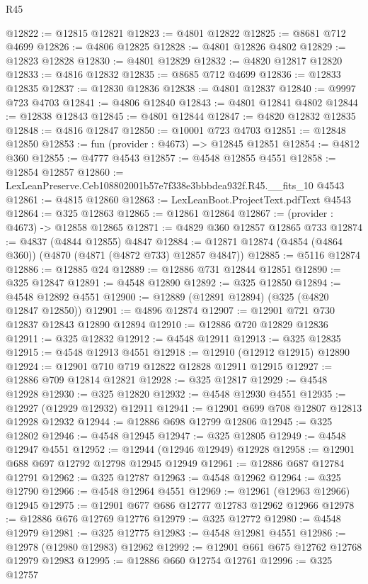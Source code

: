 \begin{lexlean}{R45}
\begin{coremodule}
@12822 := @12815 @12821
@12823 := @4801 @12822
@12825 := @8681 @712 @4699
@12826 := @4806 @12825
@12828 := @4801 @12826 @4802
@12829 := @12823 @12828
@12830 := @4801 @12829
@12832 := @4820 @12817 @12820
@12833 := @4816 @12832
@12835 := @8685 @712 @4699
@12836 := @12833 @12835
@12837 := @12830 @12836
@12838 := @4801 @12837
@12840 := @9997 @723 @4703
@12841 := @4806 @12840
@12843 := @4801 @12841 @4802
@12844 := @12838 @12843
@12845 := @4801 @12844
@12847 := @4820 @12832 @12835
@12848 := @4816 @12847
@12850 := @10001 @723 @4703
@12851 := @12848 @12850
@12853 := fun (provider : @4673) => @12845 @12851
@12854 := @4812 @360
@12855 := @4777 @4543
@12857 := @4548 @12855 @4551
@12858 := @12854 @12857
@12860 := LexLeanPreserve.Ceb108802001b57e7f338e3bbbdea932f.R45.__fits_10 @4543
@12861 := @4815 @12860
@12863 := LexLeanBoot.ProjectText.pdfText @4543
@12864 := @325 @12863
@12865 := @12861 @12864
@12867 := (provider : @4673) -> @12858 @12865
@12871 := @4829 @360 @12857 @12865 @733
@12874 := @4837 (@4844 @12855) @4847
@12884 := @12871 @12874 (@4854 (@4864 @360)) (@4870 (@4871 (@4872 @733) @12857 @4847))
@12885 := @5116 @12874
@12886 := @12885 @24
@12889 := @12886 @731 @12844 @12851
@12890 := @325 @12847
@12891 := @4548 @12890
@12892 := @325 @12850
@12894 := @4548 @12892 @4551
@12900 := @12889 (@12891 @12894) (@325 (@4820 @12847 @12850))
@12901 := @4896 @12874
@12907 := @12901 @721 @730 @12837 @12843 @12890 @12894
@12910 := @12886 @720 @12829 @12836
@12911 := @325 @12832
@12912 := @4548 @12911
@12913 := @325 @12835
@12915 := @4548 @12913 @4551
@12918 := @12910 (@12912 @12915) @12890
@12924 := @12901 @710 @719 @12822 @12828 @12911 @12915
@12927 := @12886 @709 @12814 @12821
@12928 := @325 @12817
@12929 := @4548 @12928
@12930 := @325 @12820
@12932 := @4548 @12930 @4551
@12935 := @12927 (@12929 @12932) @12911
@12941 := @12901 @699 @708 @12807 @12813 @12928 @12932
@12944 := @12886 @698 @12799 @12806
@12945 := @325 @12802
@12946 := @4548 @12945
@12947 := @325 @12805
@12949 := @4548 @12947 @4551
@12952 := @12944 (@12946 @12949) @12928
@12958 := @12901 @688 @697 @12792 @12798 @12945 @12949
@12961 := @12886 @687 @12784 @12791
@12962 := @325 @12787
@12963 := @4548 @12962
@12964 := @325 @12790
@12966 := @4548 @12964 @4551
@12969 := @12961 (@12963 @12966) @12945
@12975 := @12901 @677 @686 @12777 @12783 @12962 @12966
@12978 := @12886 @676 @12769 @12776
@12979 := @325 @12772
@12980 := @4548 @12979
@12981 := @325 @12775
@12983 := @4548 @12981 @4551
@12986 := @12978 (@12980 @12983) @12962
@12992 := @12901 @661 @675 @12762 @12768 @12979 @12983
@12995 := @12886 @660 @12754 @12761
@12996 := @325 @12757

\end{coremodule}
\end{lexlean}
